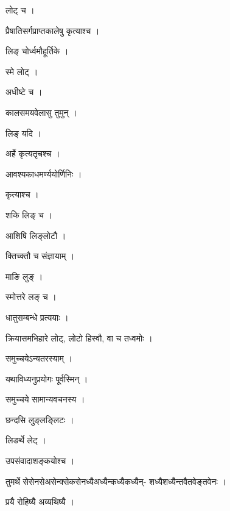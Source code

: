 \documentclass[10pt, openany, oneside]{book}
\begin{document}
\noindent लोट् च ।

\noindent प्रैषातिसर्गप्राप्तकालेषु कृत्याश्च ।

\noindent लिङ् चोर्ध्वमौहूर्तिके ।

\noindent स्मे लोट् ।

\noindent अधीष्टे च ।

\noindent कालसमयवेलासु तुमुन् ।

\noindent लिङ् यदि ।

\noindent अर्हे कृत्यतृचश्च ।

\noindent आवश्यकाधमर्ण्ययोर्णिनिः ।

\noindent कृत्याश्च ।

\noindent शकि लिङ् च ।

\noindent आशिषि लिङ्लोटौ ।

\noindent क्तिच्क्तौ च संज्ञायाम् ।

\noindent माङि लुङ् ।

\noindent स्मोत्तरे लङ् च ।

\noindent धातुसम्बन्धे प्रत्ययाः ।

\noindent क्रियासमभिहारे लोट्, लोटो हिस्वौ, वा च तध्वमोः ।

\noindent समुच्चयेऽन्यतरस्याम् ।

\noindent यथाविध्यनुप्रयोगः पूर्वस्मिन् ।

\noindent समुच्चये सामान्यवचनस्य ।

\noindent छन्दसि लुङ्लङ्लिटः ।

\noindent लिङर्थे लेट् ।

\noindent उपसंवादाशङ्कयोश्च ।

\noindent तुमर्थे सेसेनसेअसेन्क्सेकसेनध्यैअध्यैन्कध्यैकध्यैन्- शध्यैशध्यैन्तवैतवेङ्तवेनः ।

\noindent प्रयै रोहिष्यै अव्यथिष्यै ।
\end{document}
